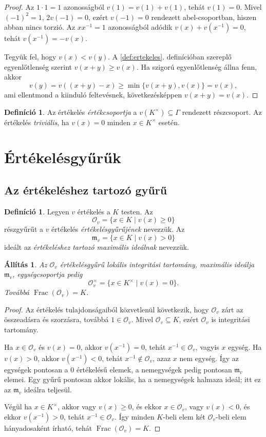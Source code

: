 \documentclass[11pt,a4paper]{article}
\newtheorem{allitas}[tetel]{Állítás}
\theoremstyle{definition}
\newtheorem{definicio}[tetel]{Definíció}
\DeclareMathOperator{\Frac}{Frac}
\newcommand{\OO}{\mathcal O}
\newcommand{\mm}{\mathfrak m}
\begin{document}
\begin{proof}
Az $1\cdot 1=1$ azonosságból
$v(1)=v(1)+v(1)$, tehát $v(1)=0$. Mivel $(-1)^2=1$,
$2v(-1)=0$, ezért $v(-1)=0$ rendezett abel-csoportban, hiszen abban
nincs torzió. Az $xx^{-1}=1$ azonosságból adódik
$v(x)+v(x^{-1})=0$, tehát $v(x^{-1})=-v(x)$.

Tegyük fel, hogy $v(x)<v(y)$. A \ref{def:ertekeles}. definícióban
szereplő egyenlőtlenség szerint $v(x+y)\geq v(x)$. Ha szigorú
egyenlőtlenség állna fenn, akkor
\[
  v(y)=v((x+y)-x)\geq \min\{v(x+y),v(x)\}=v(x),
\]
ami ellentmond a kiinduló feltevésnek, következésképpen
$v(x+y)=v(x)$.
\end{proof}

\begin{definicio}
Az értékelés \emph{értékcsoportja} a $v(K^\times)\subseteq\Gamma$
rendezett részcsoport. Az értékelés \emph{triviális}, ha
$v(x)=0$ minden $x\in K^\times$ esetén.
\end{definicio}


\section{Értékelésgyűrűk}

\subsection{Az értékeléshez tartozó gyűrű}

\begin{definicio}
Legyen $v$ értékelés a $K$ testen. Az
\[
  \OO_v=\{x\in K\mid v(x)\geq 0\}
\]
részgyűrűt a $v$ értékelés \emph{értékelésgyűrűjének} nevezzük. Az
\[
  \mm_v=\{x\in K\mid v(x)>0\}
\]
ideált az \emph{értékeléshez tartozó maximális ideálnak} nevezzük.
\end{definicio}

\begin{allitas}
Az $\OO_v$ értékelésgyűrű lokális integritási tartomány, maximális ideálja
$\mm_v$, egységcsoportja pedig
\[
  \OO_v^\times=\{x\in K^\times\mid v(x)=0\}.
\]
Továbbá $\Frac(\OO_v)=K$.
\end{allitas}

\begin{proof}
Az értékelés tulajdonságaiból közvetlenül következik, hogy $\OO_v$
zárt az összeadásra és szorzásra, továbbá $1\in\OO_v$. Mivel
$\OO_v\subseteq K$, ezért $\OO_v$ is integritási tartomány.

Ha $x\in\OO_v$ és $v(x)=0$, akkor $v(x^{-1})=0$, tehát
$x^{-1}\in\OO_v$, vagyis $x$ egység. Ha $v(x)>0$, akkor
$v(x^{-1})<0$, tehát $x^{-1}\notin\OO_v$, azaz $x$ nem egység.
Így az egységek pontosan a
$0$ értékelésű elemek, a nemegységek pedig pontosan $\mm_v$ elemei. Egy
gyűrű pontosan akkor lokális, ha a nemegységek halmaza ideál; itt ez
az $\mm_v$ ideálra teljesül.

Végül ha $x\in K^\times$, akkor vagy $v(x)\geq 0$, és ekkor
$x\in\OO_v$, vagy $v(x)<0$, és ekkor $v(x^{-1})>0$, tehát
$x^{-1}\in\OO_v$. Így minden $K$-beli elem két $\OO_v$-beli elem
hányadosaként írható, tehát $\Frac(\OO_v)=K$.
\end{proof}
\end{document}
